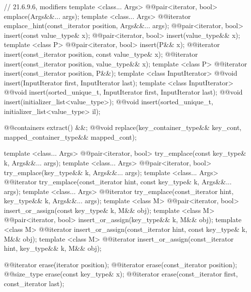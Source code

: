 \begin{codeblock}
{{    // 21.6.9.6, modifiers
    template <class... Args>
      @@pair<iterator, bool> emplace(Args&&... args);
    template <class... Args>
      @@iterator emplace_hint(const_iterator position, Args&&... args);
    @@pair<iterator, bool> insert(const value_type& x);
    @@pair<iterator, bool> insert(value_type&& x);
    template <class P> @@pair<iterator, bool> insert(P&& x);
    @@iterator insert(const_iterator position, const value_type& x);
    @@iterator insert(const_iterator position, value_type&& x);
    template <class P>
      @@iterator insert(const_iterator position, P&&);
    template <class InputIterator>
      @@void insert(InputIterator first, InputIterator last);
    template <class InputIterator>
      @@void insert(sorted_unique_t, InputIterator first, InputIterator last);
    @@void insert(initializer_list<value_type>);
    @@void insert(sorted_unique_t, initializer_list<value_type> il);

    @@containers extract() &&;
    @@void replace(key_container_type&& key_cont,
                           mapped_container_type&& mapped_cont);

    template <class... Args>
      @@pair<iterator, bool> try_emplace(const key_type& k, Args&&... args);
    template <class... Args>
      @@pair<iterator, bool> try_emplace(key_type&& k, Args&&... args);
    template <class... Args>
      @@iterator try_emplace(const_iterator hint, const key_type& k,
                           Args&&... args);
    template <class... Args>
      @@iterator try_emplace(const_iterator hint, key_type&& k, Args&&... args);
    template <class M>
      @@pair<iterator, bool> insert_or_assign(const key_type& k, M&& obj);
    template <class M>
      @@pair<iterator, bool> insert_or_assign(key_type&& k, M&& obj);
    template <class M>
      @@iterator insert_or_assign(const_iterator hint, const key_type& k,
                                          M&& obj);
    template <class M>
      @@iterator insert_or_assign(const_iterator hint, key_type&& k, M&& obj);

    @@iterator erase(iterator position);
    @@iterator erase(const_iterator position);
    @@size_type erase(const key_type& x);
    @@iterator erase(const_iterator first, const_iterator last);

}}
\end{codeblock}
